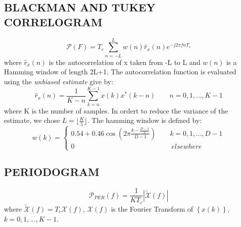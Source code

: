 \documentclass[a4paper,11pt,openright,twoside]{report}
\begin{document}
\subsection*{BLACKMAN AND TUKEY CORRELOGRAM}
\begin{equation}
\mathcal{P}(F) = T_c \sum_{n=-L}^{L} w(n)\hat{r}_x(n)e^{-j2\pi fnT_c}
\end{equation}
where $\hat{r}_x(n)$ is the autocorrelation of x taken from -L to L and $w(n)$ is a Hamming window of length 2L+1. The autocorrelation function is evaluated using the \textit{unbiased estimate} give by:
\begin{equation*}
\hat{r}_x(n) = \frac{1}{K-n}\sum_{k=n}^{K-1}x(k)x^*(k-n) \quad \quad n = 0,1,...,K-1
\end{equation*}
where K is the number of samples. In ordert to reduce the variance of the estimate, we chose $L=\lfloor \frac{K}{5} \rfloor$. The hamming window is defined by:
\begin{equation}\label{ham}
w(k) = \begin{cases}
       0.54 + 0.46 \cos \left(2\pi \frac{k-\frac{D-1}{2}}{D-1} \right) \quad \quad k=0,1,...,D-1 \\
       0 \quad \quad \quad \quad \quad \quad \quad \quad \quad\quad \quad \quad \quad \quad elsewhere
       \end{cases}
\end{equation} 


\subsection*{PERIODOGRAM}
\begin{equation}\label{Per}
\mathcal{P}_{PER}(f) = \frac{1}{KT_c} | \tilde{\mathcal{X}}(f) |
\end{equation}
where $\tilde{\mathcal{X}}(f) = T_c \mathcal{X}(f)$, $\mathcal{X}(f)$ is the Fourier Transform of $ \left\lbrace x(k) \right\rbrace$, $k = 0,1,...,K-1$.
\end{document}
